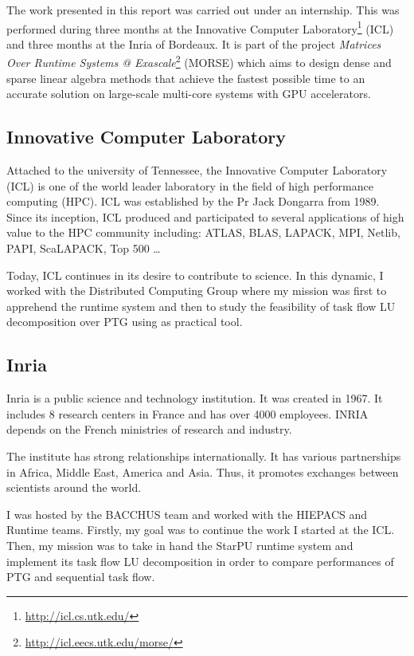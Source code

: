 The work presented in this report was carried out under an internship. This was performed during three months at the Innovative Computer Laboratory\footnote{\url{http://icl.cs.utk.edu/}} (ICL) and three months at the Inria of Bordeaux. It is part of the project \emph{Matrices Over Runtime Systems @ Exascale}\footnote{\url{http://icl.eecs.utk.edu/morse/}} (MORSE) which aims to design dense and sparse linear algebra methods that achieve the fastest possible time to an accurate solution on large-scale multi-core systems with GPU accelerators.

\subsection*{Innovative Computer Laboratory}
Attached to the university of Tennessee, the Innovative Computer Laboratory (ICL) is one of the world leader laboratory in the field of high performance computing (HPC). ICL was established by the Pr Jack Dongarra from 1989. Since its inception, ICL produced and participated to several applications of high value to the HPC community including: ATLAS, BLAS, LAPACK, MPI, Netlib, PAPI, ScaLAPACK, Top 500 \dots

Today, ICL continues in its desire to contribute to science. In this dynamic, I worked with the Distributed Computing Group where my mission was first to apprehend the \dague runtime system and then to study the feasibility of task flow LU decomposition over PTG using \dague as practical tool.

\subsection*{Inria}
Inria is a public science and technology institution. It was created in 1967. It includes 8 research centers in France and has over 4000 employees. INRIA depends on the French ministries of research and industry.

The institute has strong relationships internationally. It has various partnerships in Africa, Middle East, America and Asia. Thus, it promotes exchanges between scientists around the world.

I was hosted by the BACCHUS team and worked with the HIEPACS and Runtime teams. Firstly, my goal was to continue the work I started at the ICL. Then, my mission was to take in hand the StarPU runtime system and implement its task flow LU decomposition in order to compare performances of PTG and sequential task flow.